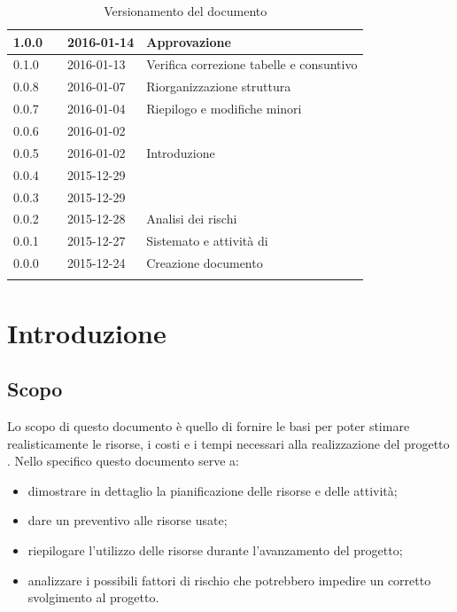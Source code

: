 \documentclass[12pt,a4paper]{article}
\begin{document}
\begin{center}
\begin{longtable}[H]{p{} p{} p{} p{}}
		\midrule
		1.0.0 & \NDC{} & 2016-01-14 & Approvazione \\*
		\midrule
		0.1.0 & \AVE{} & 2016-01-13 & Verifica correzione tabelle e consuntivo  \FA{} \\*
		\midrule
		0.0.8 & \TP{} & 2016-01-07 & Riorganizzazione struttura \\*
		\midrule
		0.0.7 & \NDC{} & 2016-01-04 & Riepilogo e modifiche minori \\*
		\midrule
		0.0.6 & \WS{} & 2016-01-02 &  \FVV{} \\*
		\midrule
		0.0.5 & \WS{} & 2016-01-02 &  Introduzione \\*
		\midrule
		0.0.4 & \TP{} & 2015-12-29 &  \FPDC{} \\*
		\midrule
		0.0.3 & \TP{} & 2015-12-29 &  \FPA{} \\*
		\midrule
		0.0.2 & \NDC{} & 2015-12-28 &  Analisi dei rischi \\*
		\midrule
		0.0.1 & \NDC{} & 2015-12-27 &  Sistemato \mgls{template} e attività di \FA{} \\*
		\midrule
		0.0.0 & \NDC{} & 2015-12-24 &  Creazione documento \\*
		\bottomrule
		\caption{Versionamento del documento}
		\label{tabVers1}
	\end{longtable}
\end{center}

\newpage
\tableofcontents
\newpage
\listoftables
\listoffigures
\newpage

\section{Introduzione} 

\subsection{Scopo}
Lo scopo di questo documento è quello di fornire le basi per poter stimare realisticamente le risorse, i costi e i tempi necessari alla realizzazione del progetto \textit{\prjL{}}. Nello specifico questo documento serve a:
\begin{itemize}
	\item dimostrare in dettaglio la pianificazione delle risorse e delle attività;
	\item dare un preventivo alle risorse usate;
	\item riepilogare l'utilizzo delle risorse durante l'avanzamento del progetto;
	\item analizzare i possibili fattori di rischio che potrebbero impedire un corretto svolgimento al progetto.
\end{itemize}
\end{document}
